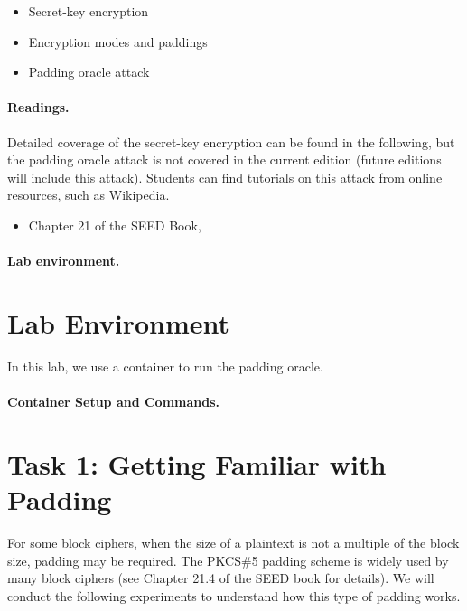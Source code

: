 \begin{itemize}[noitemsep]
\item Secret-key encryption
\item Encryption modes and paddings
\item Padding oracle attack
\end{itemize}


\paragraph{Readings.}
Detailed coverage of the secret-key encryption can be found in the following,
but the padding oracle attack is not covered in the current edition
(future editions will include this attack). Students can find tutorials
on this attack from online resources, such as Wikipedia.

\begin{itemize}
\item Chapter 21 of the SEED Book, \seedbook
\end{itemize}


\paragraph{Lab environment.} \seedenvironmentC


\section{Lab Environment}

In this lab, we use a container to run the padding oracle. 


\paragraph{Container Setup and Commands.}



\section{Task 1: Getting Familiar with Padding}

For some block ciphers, when the size of a plaintext is not a multiple
of the block size, padding may be required.
The PKCS\#5 padding scheme is widely used by many block
ciphers (see Chapter 21.4 of the SEED book for details).
We will conduct the following experiments to
understand how this type of padding works.

